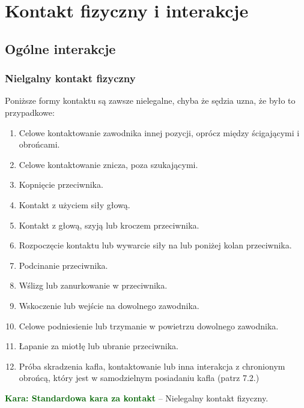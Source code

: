 \documentclass[11pt,a4paper]{article}
\newcommand\penaltyd[2]{\bgroup\textcolor{darkgreen}{\textbf{Kara: #1}} -- #2}
\begin{document}
\section{Kontakt fizyczny i interakcje}

\subsection{Ogólne interakcje}

\subsubsection{Nielgalny kontakt fizyczny}
Poniższe formy kontaktu są zawsze nielegalne, chyba że sędzia uzna, że było to przypadkowe:
\begin{enumerate}
  \item Celowe kontaktowanie zawodnika innej pozycji, oprócz między ścigającymi i obrońcami.
  \item Celowe kontaktowanie znicza, poza szukającymi.
  \item Kopnięcie przeciwnika.
  \item Kontakt z użyciem siły głową.
  \item Kontakt z głową, szyją lub kroczem przeciwnika.
  \item Rozpoczęcie kontaktu lub wywarcie siły na lub poniżej kolan przeciwnika.
  \item Podcinanie przeciwnika.
  \item Wślizg lub zanurkowanie w przeciwnika.
  \item Wskoczenie lub wejście na dowolnego zawodnika.
  \item Celowe podniesienie lub trzymanie w powietrzu dowolnego zawodnika.
  \item Łapanie za miotłę lub ubranie przeciwnika.
  \item Próba skradzenia kafla, kontaktowanie lub inna interakcja z chronionym obrońcą, który jest w samodzielnym posiadaniu kafla (patrz 7.2.) %
\end{enumerate}

\penaltyd{Standardowa kara za kontakt}{Nielegalny kontakt fizyczny.}
\end{document}
